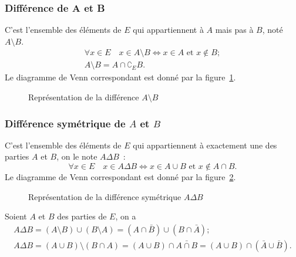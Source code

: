 \subsubsection{Différence de A et B}
\label{chap3-subsubsec:difference}
C'est l'ensemble des éléments de \(E\) qui appartiennent à \(A\) mais pas à 
\(B\), noté \(A \setminus B\).
\begin{gather}
    \forall x \in E \quad x \in A \setminus B \iff x \in A \text{~et~} x \not\in B; \\
    A \setminus B=A \cap \complement_E B.
\end{gather}
Le diagramme de Venn correspondant est donné par la figure~\ref{chap3-fig:diff}.
\begin{figure}
    \centering
    \caption{Représentation de la différence \(A \setminus B\)}
    \label{chap3-fig:diff}
\end{figure}
\subsubsection{Différence symétrique de \(A\) et \(B\)}
\label{chap3-subsubsec:differencesymetrique}
C'est l'ensemble des éléments de \(E\) qui appartiennent à exactement une des 
parties \(A\) et \(B\), on le note $A \Delta B$~:
\begin{equation}
    \forall x \in E \quad x \in A \Delta B \iff x \in A \cup B \text{~et~} x \not\in 
    A \cap B.
\end{equation}
Le diagramme de Venn correspondant est donné par la 
figure~\ref{chap3-fig:diffsym}.
\begin{figure}
    \centering
    \caption{Représentation de la différence symétrique \(A \Delta B\)}
    \label{chap3-fig:diffsym}
\end{figure}
\begin{prop}
    Soient \(A\) et \(B\) des parties de \(E\), on a 
    \begin{gather}
        A \Delta B = (A\setminus B) \cup (B \setminus A) = (A \cap \bar{B}) \cup (B \cap 
        \bar{A}); \\
        A \Delta B =(A \cup B) \setminus (B \cap A) = (A \cup B) \cap \bar{A \cap B} =(A 
        \cup B) \cap (\bar{A} \cup \bar{B}).
    \end{gather}
\end{prop}
